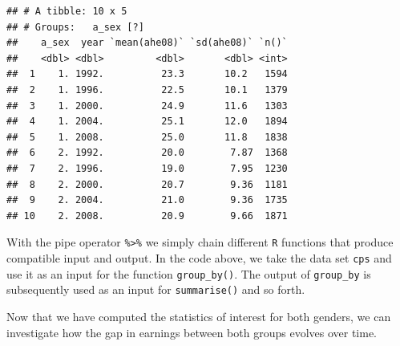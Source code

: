 \documentclass[]{book}
\newenvironment{Shaded}{\begin{snugshade}}{\end{snugshade}}
\newcommand{\KeywordTok}[1]{\textcolor[rgb]{0.13,0.29,0.53}{\textbf{#1}}}
\newcommand{\StringTok}[1]{\textcolor[rgb]{0.31,0.60,0.02}{#1}}
\newcommand{\CommentTok}[1]{\textcolor[rgb]{0.56,0.35,0.01}{\textit{#1}}}
\newcommand{\OperatorTok}[1]{\textcolor[rgb]{0.81,0.36,0.00}{\textbf{#1}}}
\newcommand{\NormalTok}[1]{#1}
\theoremstyle{definition}
\theoremstyle{definition}
\theoremstyle{definition}
\theoremstyle{remark}
\begin{document}
\begin{Shaded}
\end{Shaded}

\begin{verbatim}
## # A tibble: 10 x 5
## # Groups:   a_sex [?]
##    a_sex  year `mean(ahe08)` `sd(ahe08)` `n()`
##    <dbl> <dbl>         <dbl>       <dbl> <int>
##  1    1. 1992.          23.3       10.2   1594
##  2    1. 1996.          22.5       10.1   1379
##  3    1. 2000.          24.9       11.6   1303
##  4    1. 2004.          25.1       12.0   1894
##  5    1. 2008.          25.0       11.8   1838
##  6    2. 1992.          20.0        7.87  1368
##  7    2. 1996.          19.0        7.95  1230
##  8    2. 2000.          20.7        9.36  1181
##  9    2. 2004.          21.0        9.36  1735
## 10    2. 2008.          20.9        9.66  1871
\end{verbatim}

With the pipe operator \texttt{\%>\%} we simply chain different
\texttt{R} functions that produce compatible input and output. In the
code above, we take the data set \texttt{cps} and use it as an input for
the function \texttt{group\_by()}. The output of \texttt{group\_by} is
subsequently used as an input for \texttt{summarise()} and so forth.

Now that we have computed the statistics of interest for both genders,
we can investigate how the gap in earnings between both groups evolves
over time.
\end{document}
